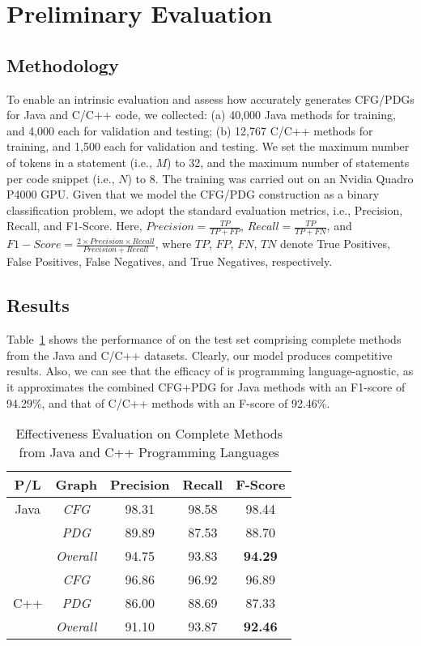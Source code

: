 \section{Preliminary Evaluation}
\subsection{Methodology}
To enable an intrinsic evaluation and assess how accurately \tool generates CFG/PDGs for Java and C/C++ code, we collected: (a) 40,000 Java methods for training, and 4,000 each for validation and testing; (b) 12,767 C/C++ methods for training, and 1,500 each for validation and testing. We set the maximum number of tokens in a statement (i.e., $M$) to 32, and the maximum number of statements per code snippet (i.e., $N$) to 8. The training was carried out on an Nvidia Quadro P4000 GPU. Given that we model the CFG/PDG construction as a binary classification problem, we adopt the standard evaluation metrics, i.e., Precision, Recall, and F1-Score. Here, $Precision = \frac{TP}{TP+FP}$, $Recall = \frac{TP}{TP+FN}$, and $F1{-}Score = \frac{2\times Precision\times Recall}{Precision+Recall}$, where $TP$, $FP$, $FN$, $TN$ denote True Positives, False Positives, False Negatives, and True Negatives, respectively.

\subsection{Results}

Table~\ref{tab:intrinsic} shows the performance of \tool on the test set comprising complete methods from the Java and C/C++ datasets. Clearly, our model produces competitive results. Also, we can see that the efficacy of \tool is programming language-agnostic, as it approximates the combined CFG+PDG
for Java methods with an F1-score of 94.29\%, and that of C/C++ methods with an F-score of 92.46\%.

\begin{table}[H]
  \centering
  \small
  \caption{Effectiveness Evaluation on Complete Methods from Java and C++ Programming Languages}
\begin{tabular}{c|c|c|c|c}
\hline
\textbf{P/L}         & \textbf{Graph}   & \textbf{Precision} & \textbf{Recall} & \textbf{F-Score} \\ \hline
Java                 & \textit{CFG}     & 98.31              & 98.58           & 98.44            \\
                     & \textit{PDG}     & 89.89              & 87.53           & 88.70            \\
                     & \textit{Overall} & 94.75            & 93.83           & \textbf{94.29}   \\
\hline
\multirow{3}{*}{C++} & \textit{CFG}     & 96.86            & 96.92         & 96.89           \\
                     & \textit{PDG}     & 86.00            & 88.69         & 87.33           \\
                     & \textit{Overall} & 91.10            & 93.87         & \textbf{92.46}  \\
\hline
\end{tabular}
\label{tab:intrinsic}
\end{table}
